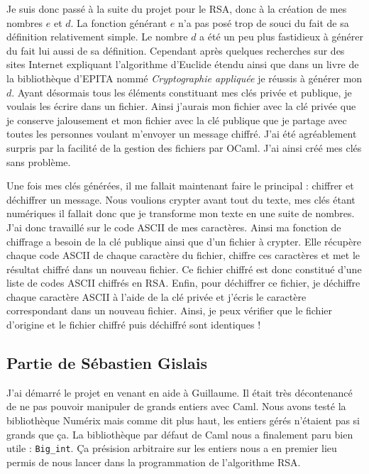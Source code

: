 \documentclass[a4paper,12pt]{article}
\begin{document}
Je suis donc passé à la suite du projet pour le RSA, donc à la création de mes nombres $e$ et $d$. La fonction générant $e$ n'a pas posé trop de souci du fait de sa définition relativement simple. Le nombre $d$ a été un peu plus fastidieux à générer du fait lui aussi de sa définition. Cependant après quelques recherches sur des sites Internet expliquant l'algorithme d'Euclide étendu ainsi que dans un livre de la bibliothèque d'EPITA nommé \textit{Cryptographie appliquée} je réussis à générer mon $d$. Ayant désormais tous les éléments constituant mes clés privée et publique, je voulais les écrire dans un fichier. Ainsi j'aurais mon fichier avec la clé privée que je conserve jalousement et mon fichier avec la clé publique que je partage avec toutes les personnes voulant m'envoyer un message chiffré. J'ai été agréablement surpris par la facilité de la gestion des fichiers par OCaml. J'ai ainsi créé mes clés sans problème.

Une fois mes clés générées, il me fallait maintenant faire le principal : chiffrer et déchiffrer un message. Nous voulions crypter avant tout du texte, mes clés étant numériques il fallait donc que je transforme mon texte en une suite de nombres. J'ai donc travaillé sur le code ASCII de mes caractères. Ainsi ma fonction de chiffrage a besoin de la clé publique ainsi que d'un fichier à crypter. Elle récupère chaque code ASCII de chaque caractère du fichier, chiffre ces caractères et met le résultat chiffré dans un nouveau fichier. Ce fichier chiffré est donc constitué d'une liste de codes ASCII chiffrés en RSA. Enfin, pour déchiffrer ce fichier, je déchiffre chaque caractère ASCII à l'aide de la clé privée et j'écris le caractère correspondant dans un nouveau fichier. Ainsi, je peux vérifier que le fichier d'origine et le fichier chiffré puis déchiffré sont identiques !

\newpage

\subsection{Partie de Sébastien Gislais}

J'ai démarré le projet en venant en aide à Guillaume. Il était très déconte\-nancé de ne pas pouvoir manipuler de grands entiers avec Caml. Nous avons testé la bibliothèque Numérix mais comme dit plus haut, les entiers gérés n'étaient pas si grands que ça. La bibliothèque par défaut de Caml nous a finalement paru bien utile : \texttt{Big\_int}. Ça présision arbitraire sur les entiers nous a en premier lieu permis de nous lancer dans la programmation de l'algorithme RSA.
\end{document}
